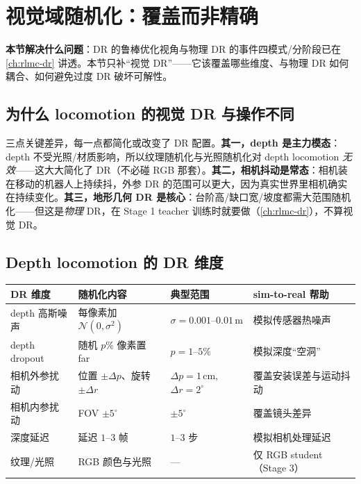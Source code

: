 \section{视觉域随机化：覆盖而非精确}
\label{sec:rlmc-vm-dr}

\textbf{本节解决什么问题}：DR 的鲁棒优化视角与物理 DR 的事件四模式/分阶段已在 \cref{ch:rlmc-dr} 讲透。本节只补“视觉 DR”——它该覆盖哪些维度、与物理 DR 如何耦合、如何避免过度 DR 破坏可解性。

\subsection{为什么 locomotion 的视觉 DR 与操作不同}
\label{sec:rlmc-vm-dr-why}

三点关键差异，每一点都简化或改变了 DR 配置。\textbf{其一，depth 是主力模态}：depth 不受光照/材质影响，所以纹理随机化与光照随机化对 depth locomotion \emph{无效}——这大大简化了 DR（不必碰 RGB 那套）。\textbf{其二，相机抖动是常态}：相机装在移动的机器人上持续抖，外参 DR 的范围可以更大，因为真实世界里相机确实在持续变化。\textbf{其三，地形几何 DR 是核心}：台阶高/缺口宽/坡度都需大范围随机化——但这是\emph{物理} DR，在 Stage 1 teacher 训练时就要做（\cref{ch:rlmc-dr}），不算视觉 DR。

\subsection{Depth locomotion 的 DR 维度}
\label{sec:rlmc-vm-dr-dims}

\begin{center}
\small
\begin{tabular}{@{}p{2.6cm}p{3.4cm}p{2.6cm}p{3.0cm}@{}}
\toprule
DR 维度 & 随机化内容 & 典型范围 & sim-to-real 帮助 \\
\midrule
depth 高斯噪声 & 每像素加 $\mathcal{N}(0,\sigma^2)$ & $\sigma=0.001$--$0.01$\,m & 模拟传感器热噪声 \\
depth dropout & 随机 $p\%$ 像素置 far & $p=1$--$5\%$ & 模拟深度“空洞” \\
相机外参扰动 & 位置 $\pm\Delta p$、旋转 $\pm\Delta r$ & $\Delta p=1$\,cm, $\Delta r=2^\circ$ & 覆盖安装误差与运动抖动 \\
相机内参扰动 & FOV $\pm 5^\circ$ & $\pm 5^\circ$ & 覆盖镜头差异 \\
深度延迟 & 延迟 $1$--$3$ 帧 & $1$--$3$ 步 & 模拟相机处理延迟 \\
纹理/光照 & RGB 颜色与光照 & --- & 仅 RGB student（Stage 3） \\
\bottomrule
\end{tabular}
\end{center}

